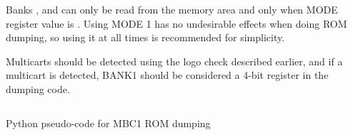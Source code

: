 Banks ,  and  can only be read from the
 memory area and only when MODE register value is .
Using MODE 1 has no undesirable effects when doing ROM dumping, so using it at
all times is recommended for simplicity.

Multicarts should be detected using the logo check described earlier, and if a
multicart is detected, BANK1 should be considered a 4-bit register in the
dumping code.

\begin{listing}[H]
  \inputminted[frame=lines]{python}{code-snippets/mbc1_dump.py}
  \caption{Python pseudo-code for MBC1 ROM dumping}
\end{listing}
